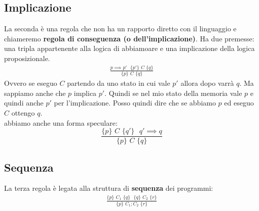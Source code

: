 \subsection{Implicazione}
\begin{definizione}
	La seconda è una regola che non ha un rapporto diretto con il linguaggio e
	chiameremo \textbf{regola di conseguenza (o dell'implicazione)}. Ha due
	premesse: una tripla appartenente alla logica di abbiamoare e una implicazione della
	logica proposizionale.
	\begin{align}\label{ImplicationRule}
		\frac{p\implies p'\,\, \,\,\{p'\}\,\, C\,\,\{q\}}{\{p\}\,\, C\,\,\{q\}} 
	\end{align}
	Ovvero se eseguo $C$ partendo da uno stato in cui vale $p'$ allora dopo varrà
	$q$. Ma sappiamo anche che $p$ implica $p'$. Quindi se nel mio stato della
	memoria vale $p$ e quindi anche $p'$ per l'implicazione. Posso quindi dire che
	se abbiamo $p$ ed eseguo $C$ ottengo $q$.\\
	abbiamo anche una forma speculare:
	\[\frac{\{p\}\,\, C\,\,\{q'\}\,\, \,\, q'\implies q}{\{p\}\,\, C\,\,\{q\}}\]
\end{definizione} \vspace{5mm} %
\subsection{Sequenza}
\begin{definizione}
	La terza regola è legata alla struttura di \textbf{sequenza} dei programmi:
	\begin{align}\label{SequenceRule}
		\frac{\{p\}\,\, C_1\,\,\{q\}\,\,                       
		\,\,\{q\}\,\, C_2\,\,\{r\}}{\{p\}\,\, C_1;C_2\,\,\{r\}} 
	\end{align}
		  
		
\end{definizione} \vspace{5mm} %

